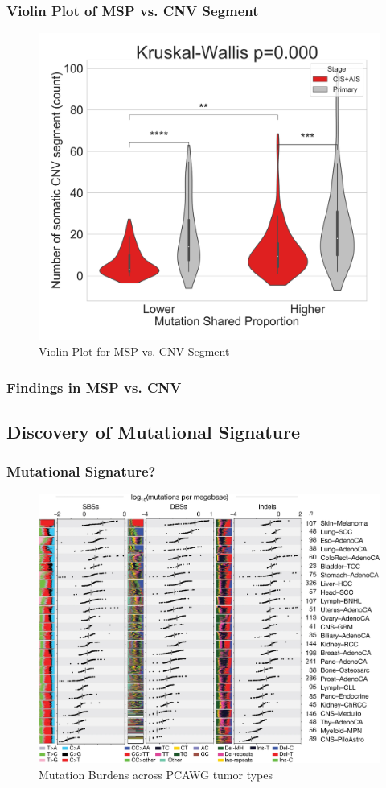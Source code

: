 \documentclass{beamer}
\begin{document}
    \begin{frame}
        \frametitle{Violin Plot of MSP vs. CNV Segment}

        \begin{figure}
            \includegraphics[width=0.4 \linewidth]{figures/MutationSharedProportion_CNV/Segment/Segment.BWA.Sequenza.SQC.median/Violin_Mutation Shared Proportion.pdf}
            \caption{Violin Plot for MSP vs. CNV Segment}
        \end{figure}
    \end{frame}

    \begin{frame}[allowframebreaks]
        \frametitle{Findings in MSP vs. CNV}
    \end{frame}

    \subsection{Discovery of Mutational Signature}
    \begin{frame}
        \frametitle{Mutational Signature?}

        \begin{figure}
            \includegraphics[width=0.6 \linewidth]{figures/LungCancer/signatures.jpg}
            \caption{Mutation Burdens across PCAWG tumor types \protect\cite{signature1}}
        \end{figure}
    \end{frame}
\end{document}
